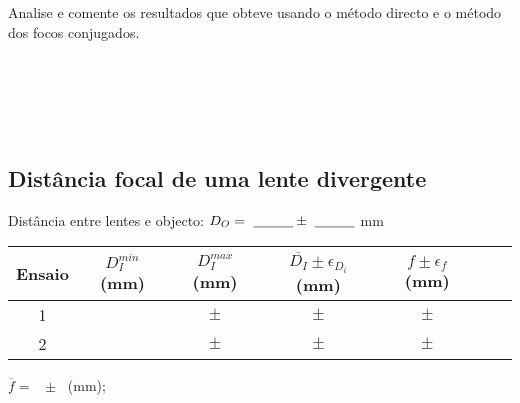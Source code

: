 \documentclass[a4paper,12pt]{article}  %
\begin{document}
Analise e comente os resultados que obteve usando o método directo e o método dos focos conjugados.

\noindent\underline{\makebox[\textwidth][r]{~}} \\
\noindent\underline{\makebox[\textwidth][r]{~}} \\
\noindent\underline{\makebox[\textwidth][r]{~}} \\
\noindent\underline{\makebox[\textwidth][r]{~}} \\


\subsection{\sf Distância focal de uma lente divergente}

Distância entre lentes e objecto: $D_O=~\underline{\makebox[1cm][r]{~}}\pm~\underline{\makebox[1cm][r]{~}}$ mm

\begin{center}
	\begin{tabular}{|c|c|c|c|c|c|c|}
	\hline
	 Ensaio &
	  $ D_{I}^{min}$ (mm) & 
	  $ D_I^{max}$ (mm) & 
	  $ \overline{D_{I}}\pm\epsilon_{D_i}$ (mm) &
	  $f\pm\epsilon_f$ (mm)\\
	\hline \hline
	1 & &  $\quad \pm \quad$ & $\quad \pm \quad$& $\qquad \pm \qquad$ \\ \cline{1-5}
	2 & & $\quad \pm \quad$ & $\quad \pm \quad$& $\quad \pm \quad$ \\ \hline
	  \end{tabular}
\end{center}
 $\overline{f} =$ ~\underline{\makebox[1cm][r]{~}}$\pm$~\underline{\makebox[1cm][r]{~}} (mm); 



\end{document}

